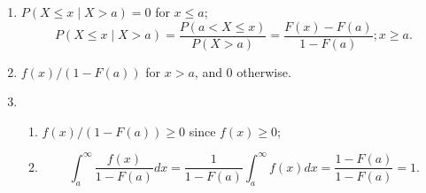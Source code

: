 

\setcounter{theorem}{3}
\begin{exercise}[BH.5.4] 
\begin{solution}
    \begin{enumerate}
        \item  $P(X \leq x \mid X>a)=0$ for $x \leq a$;  
        $$
        P(X \leq x \mid X>a)=\frac{P(a<X \leq x)}{P(X>a)}=\frac{F(x)-F(a)}{1-F(a)}; x\geq a .
        $$
        \item  $f(x) /(1-F(a))$ for $x>a$, and 0 otherwise.
        \item 
        \begin{enumerate}
            \item $f(x) /(1-F(a)) \geq 0$ since $f(x) \geq 0$;
            \item 	$$
            \int_a^{\infty} \frac{f(x)}{1-F(a)} d x=\frac{1}{1-F(a)} \int_a^{\infty} f(x) d x=\frac{1-F(a)}{1-F(a)}=1 .
            $$
        \end{enumerate} 
    
    \end{enumerate}
\end{solution}
\end{exercise}


